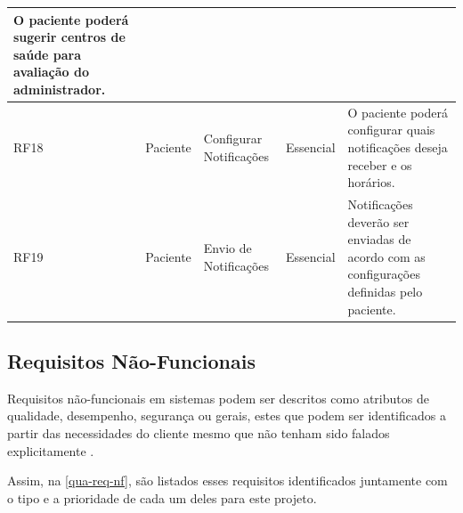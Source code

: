 \begin{quadro}[htb]
\begin{center}
\begin{tabular}{|p{1.1cm}|p{1.3cm}|p{3.0cm}|p{1.5cm}|p{6.7cm}|}
            O paciente poderá sugerir centros de saúde para avaliação do administrador.                                    \\
            \hline
            RF18            & Paciente        & Configurar Notificações         & Essencial           &
            O paciente poderá configurar quais notificações deseja receber e os horários.                                  \\
            \hline
            RF19            & Paciente        & Envio de Notificações           & Essencial           &
            Notificações deverão ser enviadas de acordo com as configurações definidas pelo paciente.                      \\
            \hline
        \end{tabular}
    \end{center}
\end{quadro}

\newpage

\subsection{Requisitos Não-Funcionais}

Requisitos não-funcionais em sistemas podem ser descritos como atributos de qualidade, desempenho, segurança ou gerais, estes que podem
ser identificados a partir das necessidades do cliente mesmo que não tenham sido falados explicitamente \cite{pressman2014software}.

Assim, na \autoref{qua-req-nf}, são listados esses requisitos identificados juntamente com o tipo e a prioridade
de cada um deles para este projeto.

